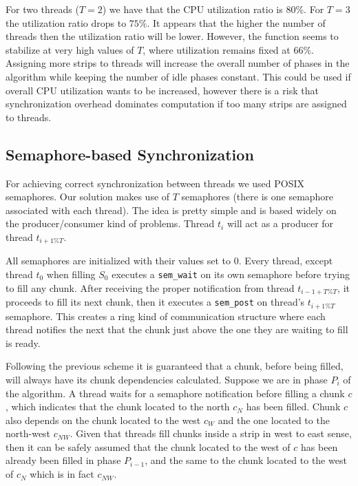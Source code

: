\documentclass[journal]{IEEEtran}
\begin{document}
For two threads ($T = 2$) we have that the CPU utilization ratio is 80\%. For $T = 3$ the utilization ratio drops to $75\%$. It appears that the higher the number of threads then the utilization ratio will be lower. However, the function seems to stabilize at very high values of $T$, where utilization remains fixed at $66\%$. Assigning more strips to threads will increase the overall number of phases in the algorithm while keeping the number of idle phases constant. This could be used if overall CPU utilization wants to be increased, however there is a risk that synchronization overhead dominates computation if too many strips are assigned to threads. 

\subsection{Semaphore-based Synchronization}

For achieving correct synchronization between threads we used POSIX semaphores. Our solution makes use of $T$ semaphores (there is one semaphore associated with each thread). The idea is pretty simple and is based widely on the producer/consumer kind of problems. Thread $t_i$ will act as a producer for thread $t_{i + 1 \% T}$. 

All semaphores are initialized with their values set to 0. Every thread, except thread $t_0$ when filling $S_0$ executes a {\tt sem\_wait} on its own semaphore before trying to fill any chunk. After receiving the proper notification from thread $t_{i-1+T \% T}$, it proceeds to fill its next chunk, then it executes a {\tt sem\_post} on thread's $t_{i + 1 \% T}$ semaphore. This creates a ring kind of communication structure where each thread notifies the next that the chunk just above the one they are waiting to fill is ready.

Following the previous scheme it is guaranteed that a chunk, before being filled, will always have its chunk dependencies calculated. Suppose we are in phase $P_i$ of the algorithm. A thread waits for a semaphore notification before filling a chunk $c$, which indicates that the chunk located to the north $c_N$ has been filled. Chunk $c$ also depends on the chunk located to the west $c_W$ and the one located to the north-west $c_{NW}$. Given that threads fill chunks inside a strip in west to east sense, then it can be safely assumed that the chunk located to the west of $c$ has been already been filled in phase $P_{i-1}$, and the same to the chunk located to the west of $c_{N}$ which is in fact $c_{NW}$. 
\end{document}
